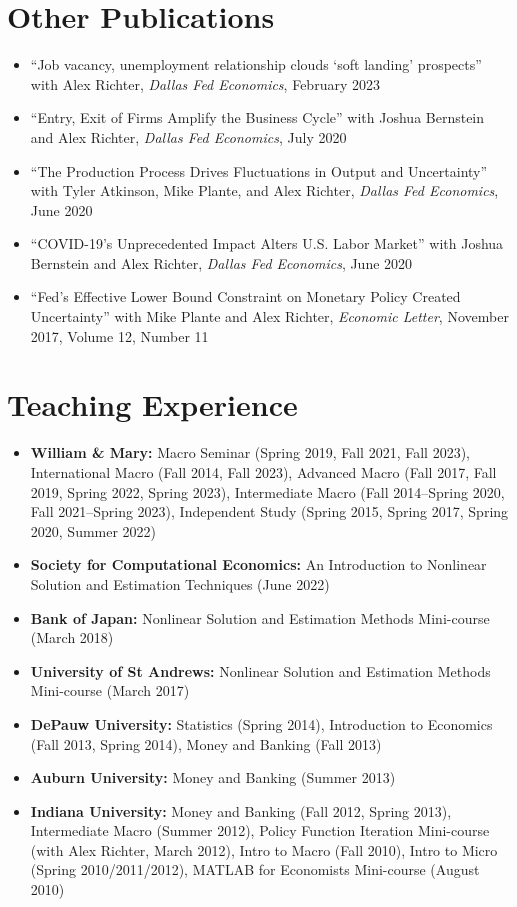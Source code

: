 \documentclass[10pt,letterpaper,en-US]{article}
\begin{document}
\section*{Other Publications}
\begin{itemize}
\item ``Job vacancy, unemployment relationship clouds ‘soft landing’ prospects'' with Alex Richter, \emph{Dallas Fed Economics}, February 2023
\item ``Entry, Exit of Firms Amplify the Business Cycle'' with Joshua Bernstein and Alex Richter, \emph{Dallas Fed Economics}, July 2020
\item ``The Production Process Drives Fluctuations in Output and Uncertainty'' with Tyler Atkinson, Mike Plante, and Alex Richter, \emph{Dallas Fed Economics}, June 2020
\item ``COVID-19’s Unprecedented Impact Alters U.S. Labor Market'' with Joshua Bernstein and Alex Richter, \emph{Dallas Fed Economics}, June 2020
\item ``Fed's Effective Lower Bound Constraint on Monetary Policy Created Uncertainty'' with Mike Plante and Alex Richter, \emph{Economic Letter}, November 2017, Volume 12, Number 11
\end{itemize}

\section*{Teaching Experience}

\begin{itemize}

\item \textbf{William \& Mary:} Macro Seminar (Spring 2019, Fall 2021, Fall 2023), International Macro (Fall 2014, Fall 2023), Advanced Macro (Fall 2017, Fall 2019, Spring 2022, Spring 2023), Intermediate Macro (Fall 2014--Spring 2020, Fall 2021--Spring 2023), Independent Study (Spring 2015, Spring 2017, Spring 2020, Summer 2022)
\item \textbf{Society for Computational Economics:} An Introduction to Nonlinear Solution and Estimation Techniques (June 2022)
\item \textbf{Bank of Japan:} Nonlinear Solution and Estimation Methods Mini-course (March 2018)
\item \textbf{University of St Andrews:} Nonlinear Solution and Estimation Methods Mini-course (March 2017)
\item \textbf{DePauw University:} Statistics (Spring 2014), Introduction to Economics (Fall 2013, Spring 2014), Money and Banking (Fall 2013)
\item \textbf{Auburn University:} Money and Banking (Summer 2013)
\item \textbf{Indiana University:} Money and Banking (Fall 2012, Spring 2013), Intermediate Macro (Summer 2012), Policy Function Iteration Mini-course (with Alex Richter, March 2012), Intro to Macro (Fall 2010), Intro to Micro (Spring 2010/2011/2012), MATLAB for Economists Mini-course (August 2010)
\end{itemize}
\end{document}
